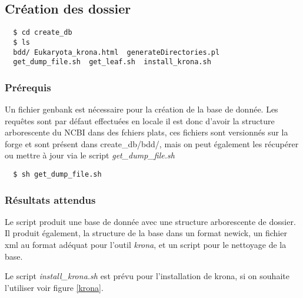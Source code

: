 \subsection{Création des dossier}
\label{createdb}

\begin{verbatim}
  $ cd create_db
  $ ls 
  bdd/ Eukaryota_krona.html  generateDirectories.pl  
  get_dump_file.sh  get_leaf.sh  install_krona.sh
\end{verbatim}
\subsubsection{Prérequis}

Un fichier genbank est nécessaire pour la création de la base de donnée.
Les requêtes sont par défaut effectuées en locale il est donc d'avoir la structure arborescente du NCBI 
dans des fchiers plats, ces fichiers sont versionnés sur la forge et sont présent dans create\_db/bdd/, mais on peut également les récupérer ou mettre
à jour via le script\textit{ get\_dump\_file.sh }

\begin{verbatim}
  $ sh get_dump_file.sh
  \end{verbatim}



\subsubsection{Résultats attendus}
Le script produit une base de donnée avec une structure arborescente de dossier. Il produit également, la structure
de la base dans un format newick, un fichier xml au format adéquat pour l'outil \textit{krona}, et un script pour le nettoyage de la base.

Le script \textit{install\_krona.sh} est prévu pour l'installation de krona, si on souhaite l'utiliser voir figure \ref{krona}.

